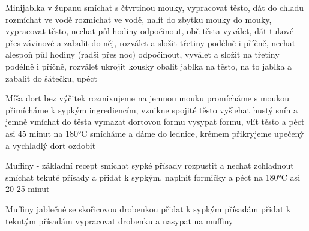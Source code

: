 \documentclass[12pt,a4paper]{article}
\begin{document}
\begin{recipe}{Minijablka v županu}
   smíchat s čtvrtinou mouky, vypracovat těsto, dát do chladu 
   rozmíchat ve vodě
   rozmíchat ve vodě, nalít do zbytku mouky
   do mouky, vypracovat těsto, nechat půl hodiny odpočinout, obě těsta vyválet, dát tukové přes
    závinové a zabalit do něj, rozválet a složit třetiny podélně i příčně, nechat alespoň půl hodiny (radši přes noc)
    odpočinout, vyválet a složit na třetiny podélně i příčně, rozválet
   ukrojit kousky
   obalit jablka
   na těsto, na to jablka a zabalit do šátečku, upéct
\end{recipe}
\newpage

\begin{recipe}{Míša dort bez výčitek}
   rozmixujeme na jemnou mouku
   promícháme s moukou
   přimícháme k sypkým ingrediencím, vznikne spojité těsto
   vyšlehat hustý sníh a jemně vmíchat do těsta
   vymazat dortovou formu
   vysypat formu, vlít těsto a péct asi 45 minut na 180°C
   smícháme a dáme do lednice, krémem přikryjeme upečený a vychladlý dort
   ozdobit
\end{recipe}
\newpage

\begin{recipe}{Muffiny - základní recept}
   smíchat sypké přísady
   rozpustit a nechat zchladnout
   smíchat tekuté přísady a přidat k sypkým, naplnit formičky a péct na 180°C asi 20-25 minut
\end{recipe}
\newpage

\begin{recipe}{Muffiny jablečné se skořicovou drobenkou}
   přidat k sypkým přísadám
   přidat k tekutým přísadám
   vypracovat drobenku a nasypat na muffiny
\end{recipe}
\newpage
\end{document}
